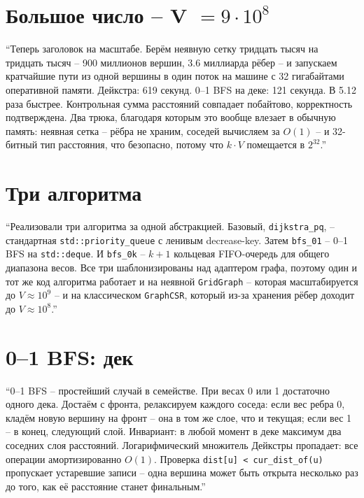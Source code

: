 \documentclass[11pt,a4paper]{article}
\begin{document}
\section{Большое число -- V $= 9 \cdot 10^8$}
``Теперь заголовок на масштабе. Берём неявную сетку тридцать тысяч на
тридцать тысяч -- 900 миллионов вершин, 3.6 миллиарда рёбер -- и
запускаем кратчайшие пути из одной вершины в один поток на машине с
32 гигабайтами оперативной памяти. Дейкстра: 619 секунд. 0--1 BFS
на деке: 121 секунда. В 5.12 раза быстрее. Контрольная сумма
расстояний совпадает побайтово, корректность подтверждена. Два
трюка, благодаря которым это вообще влезает в обычную память: неявная
сетка -- рёбра не храним, соседей вычисляем за $O(1)$ -- и 32-битный
тип расстояния, что безопасно, потому что $k \cdot V$ помещается в
$2^{32}$.''
\hrulefill

\section{Три алгоритма}
``Реализовали три алгоритма за одной абстракцией. Базовый,
\texttt{dijkstra\_pq}, -- стандартная \texttt{std::priority\_queue} с
ленивым decrease-key. Затем \texttt{bfs\_01} -- 0--1 BFS на
\texttt{std::deque}. И \texttt{bfs\_0k} -- $k{+}1$ кольцевая FIFO-очередь
для общего диапазона весов. Все три шаблонизированы над адаптером
графа, поэтому один и тот же код алгоритма работает и на неявной
\texttt{GridGraph} -- которая масштабируется до $V \approx 10^9$ -- и
на классическом \texttt{GraphCSR}, который из-за хранения рёбер
доходит до $V \approx 10^8$.''
\hrulefill

\section{0--1 BFS: дек}
``0--1 BFS -- простейший случай в семействе. При весах 0 или 1
достаточно одного дека. Достаём с фронта, релаксируем каждого соседа:
если вес ребра 0, кладём новую вершину на фронт -- она в том же слое,
что и текущая; если вес 1 -- в конец, следующий слой. Инвариант: в
любой момент в деке максимум два соседних слоя расстояний.
Логарифмический множитель Дейкстры пропадает: все операции
амортизированно $O(1)$. Проверка \texttt{dist[u] < cur\_dist\_of(u)}
пропускает устаревшие записи -- одна вершина может быть открыта
несколько раз до того, как её расстояние станет финальным.''
\hrulefill
\end{document}
